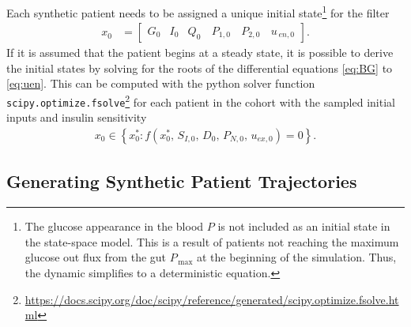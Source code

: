 \documentclass[nomenclature, english, bibtex]{kththesis}
\begin{document}
Each synthetic patient needs to be assigned a unique initial state\footnote{The glucose appearance in the blood $P$ is not included as an initial state in the state-space model. This is a result of patients not reaching the maximum glucose out flux from the gut $P_{\,\text{max}}$ at the beginning of the simulation. Thus, the dynamic simplifies to a deterministic equation.} for the filter
\begin{align}
x_0 &= \begin{bmatrix}
G_0 & I_0 & Q_0 & \,P_{1,0} & \,P_{2,0} & \,u_{\,en, 0}
\end{bmatrix}.
\end{align}
If it is assumed that the patient begins at a steady state, it is possible to derive the initial states by solving for the roots of the differential equations \eqref{eq:BG} to \eqref{eq:uen}. This can be computed with the python solver function \texttt{scipy.optimize.fsolve}\footnote{\url{https://docs.scipy.org/doc/scipy/reference/generated/scipy.optimize.fsolve.html}} for each patient in the cohort with the sampled initial inputs and insulin sensitivity
\begin{align}
x_0 \in \left\{x^*_0: f \left(x^*_0, \,S_{I,0}, \,D_0, \,P_{N,0}, \,u_{ex,0}\right) = 0\right\}.
\end{align}

\subsection{Generating Synthetic Patient Trajectories}
\end{document}
